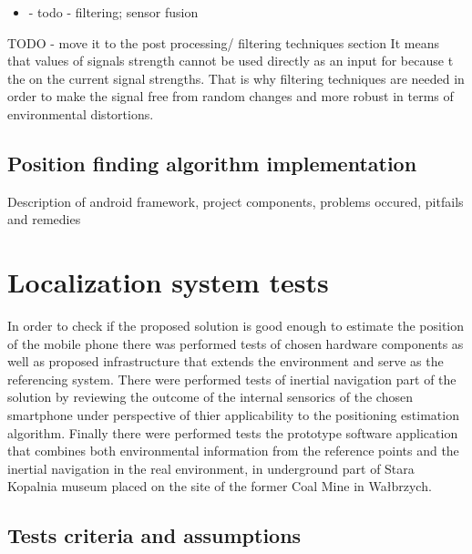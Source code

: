 \documentclass[../main.tex]{subfiles}
\begin{document}
\begin{itemize}
	\item - todo - filtering; sensor fusion
\end{itemize}

TODO - move it to the post processing/ filtering techniques section
It means that values of signals strength cannot be used directly as an input for  because t the on the current signal strengths. That is why filtering techniques are needed in order to make the signal free from random changes and more robust in terms of environmental distortions.


\section{Position finding algorithm implementation} %
\label{sec:simple_position_finding_algorithm_implementation}

Description of android framework, project components, problems occured, pitfails and remedies

\chapter{Localization system tests}

In order to check if the proposed solution is good enough to estimate the position of the mobile phone there was performed tests of chosen hardware components as well as proposed infrastructure that extends the environment and serve as the referencing system. There were performed tests of inertial navigation part of the solution by reviewing the outcome of the internal sensorics of the chosen smartphone under perspective of thier applicability to the positioning estimation algorithm. Finally there were performed tests the prototype software application that combines both environmental information from the reference points and the inertial navigation in the real environment, in underground part of Stara Kopalnia museum placed on the site of the former Coal Mine in Wałbrzych.

\section{Tests criteria and assumptions} %
\label{sec:tests_criteria_and_assumptions}
\end{document}
